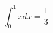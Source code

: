 \documentclass{article}
\begin{document}
\begin{equation*}
  \int_0^1x dx = \frac{1}{3}
\end{equation*}
\end{document}
